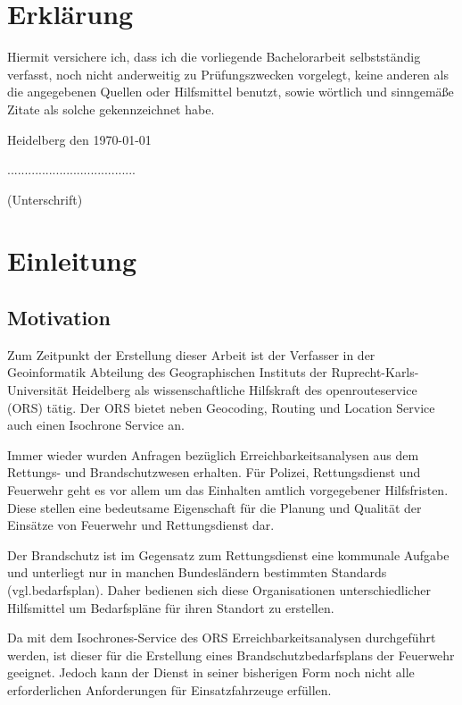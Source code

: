 \documentclass[12pt,a4paper]{article}
\begin{document}
\newpage
\section*{Erklärung}
\vspace{1cm}
Hiermit versichere ich, dass ich die vorliegende Bachelorarbeit selbstständig verfasst, noch nicht anderweitig zu Prüfungszwecken vorgelegt, keine anderen als die angegebenen Quellen oder Hilfsmittel benutzt, sowie wörtlich und sinngemäße Zitate als solche gekennzeichnet habe.\par
\bigskip

{\flushleft Heidelberg den \today } {\hfill .....................................\par}
{\hfill (Unterschrift)}

\newpage
\tableofcontents

\newpage
\listoffigures


\newpage
\section{Einleitung}

\subsection{Motivation}
Zum Zeitpunkt der Erstellung dieser Arbeit ist der Verfasser in der Geoinformatik Abteilung des Geographischen Instituts der Ruprecht-Karls-Universität Heidelberg als wissenschaftliche Hilfskraft des openrouteservice (ORS) tätig. Der ORS bietet neben Geocoding, Routing und Location Service auch einen Isochrone Service an. \par
\bigskip
Immer wieder wurden Anfragen bezüglich Erreichbarkeitsanalysen aus dem Rettungs- und Brandschutzwesen erhalten. Für Polizei, Rettungsdienst und Feuerwehr geht es vor allem um das Einhalten amtlich vorgegebener Hilfsfristen. Diese stellen eine bedeutsame Eigenschaft für die Planung und Qualität der Einsätze von Feuerwehr und Rettungsdienst dar.\par
Der Brandschutz ist im Gegensatz zum Rettungsdienst eine kommunale Aufgabe und unterliegt nur in manchen Bundesländern bestimmten Standards (vgl.{bedarfsplan}). Daher bedienen sich diese Organisationen unterschiedlicher Hilfsmittel um Bedarfspläne für ihren Standort zu erstellen.
\medskip

Da mit dem Isochrones-Service des ORS Erreichbarkeitsanalysen durchgeführt werden, ist dieser für die Erstellung eines Brandschutzbedarfsplans der Feuerwehr geeignet. Jedoch kann der Dienst in seiner bisherigen Form noch nicht alle erforderlichen Anforderungen für Einsatzfahrzeuge erfüllen.
\vspace{1.2cm}
\end{document}
